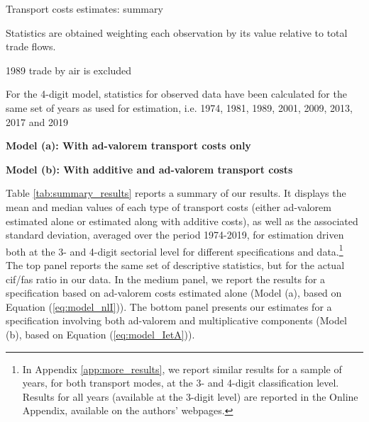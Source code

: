 \documentclass[a4paper,11pt]{article}
\begin{document}
\begin{table}[htbp]
 \centering
\caption{Transport costs estimates: summary} \vspace{5mm} \label{tab:summary_results}
	
		\begin{tablenotes}
		\tiny
		\item Statistics are obtained weighting each observation by its value relative to total trade flows.
		\item 1989 trade by air is excluded
		\item For the  4-digit model, statistics for observed data have been calculated for the same set of years as used for estimation, i.e.
		1974, 1981, 1989, 2001, 2009, 2013, 2017 and 2019
		\item \textbf{Model (a): With ad-valorem transport costs only}
		\item \textbf{Model (b): With additive and ad-valorem transport costs}
	\end{tablenotes}
\end{table}

Table \ref{tab:summary_results} reports a summary of our results.
It displays the mean and median values of each type of transport costs (either ad-valorem estimated alone or estimated along with additive costs), as well as the associated standard deviation, averaged over the period 1974-2019, for estimation driven both at the 3- and 4-digit sectorial level for different specifications and data.\footnote{In Appendix \ref{app:more_results}, we report similar results for a sample of years, for both transport modes, at the 3- and 4-digit classification level. Results for all years (available at the 3-digit level) are reported in the Online Appendix, available on the authors' webpages.}
The top panel reports the same set of descriptive statistics, but for the actual cif/fas ratio in our data. In the medium panel, we report the results for a specification based on ad-valorem costs estimated alone (Model (a), based on Equation (\ref{eq:model_nlI})). The bottom panel presents our estimates for a specification involving both ad-valorem and multiplicative components (Model (b), based on Equation (\ref{eq:model_IetA})).
\end{document}
